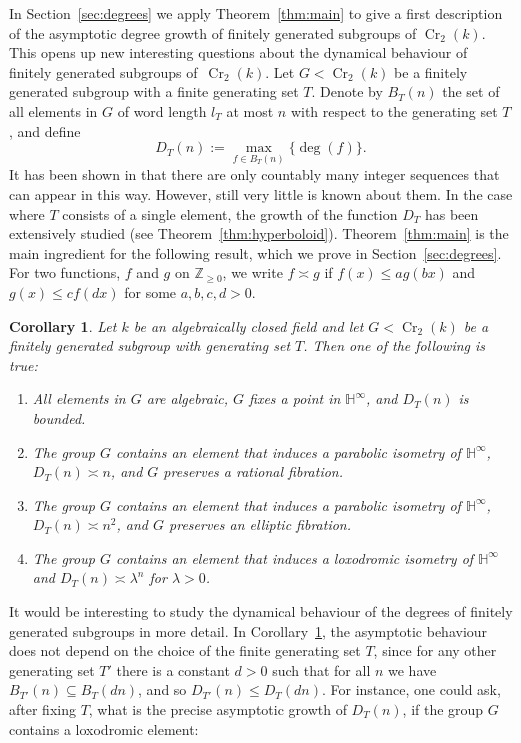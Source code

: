 \documentclass[11pt]{article}
\numberwithin{equation}{section}
\newcommand{\h}{\operatorname{\mathbb{H}^{\infty}}}
\newcommand{\N}{\operatorname{\mathbb{Z}_{\geq 0}}}
\newcommand{\kk}{k}
\newcommand{\Cr}{\operatorname{Cr}}
\theoremstyle{plain}
\newtheorem{corollary}[theorem]{Corollary}
\theoremstyle{definition}
\begin{document}
In Section~\ref{sec:degrees} we apply Theorem~\ref{thm:main} to give a first description of the asymptotic degree growth of finitely generated subgroups of $\Cr_2(k)$. This opens up new interesting questions about the dynamical behaviour of finitely generated subgroups of~$\Cr_2(k)$. Let $G<\Cr_2(k)$ be a finitely generated subgroup with a finite generating set $T$. Denote by $B_T(n)$ the set of all elements in $G$ of word length $l_T$ at most $n$ with respect to the generating set $T$, and define
\[
D_{T}(n):=\max_{f\in B_T(n)}\{\deg(f)\}.
\]
It has been shown in \cite{MR3818624} that there are only countably many integer sequences that can appear in this way. However, still very little is known about them. In the case where $T$ consists of a single element, the growth of the function $D_T$ has been {extensively} studied (see Theorem~\ref{thm:hyperboloid}). Theorem~\ref{thm:main} is the main ingredient for the following result, which we prove in Section~\ref{sec:degrees}. For two functions, $f$ and $g$ on $\N$, we write $f\asymp g$ if $f(x)\leq ag(bx)$ and $g(x)\leq cf(dx)$ for some $a,b,c,d>0$.
\begin{corollary}\label{cor:degree}
Let $\kk$ be an algebraically closed field and let $G<\Cr_2(k)$ be a finitely generated subgroup with generating set $T$. Then one of the following is true:
\begin{enumerate}
\item All elements in $G$ are algebraic, $G$ fixes a point in $\h$, and $D_T(n)$ is bounded.
\item[(2a)] The group $G$ contains an element that induces a parabolic isometry of $\h$, $D_T(n)\asymp n$, and $G$ preserves a rational fibration.
\item[(2b)] The group $G$ contains an element that induces a parabolic isometry of $\h$, $D_T(n)\asymp n^2$, and $G$ preserves an elliptic fibration.
\item[(3)] The group $G$ contains an element that induces a loxodromic isometry of $\h$ and $D_T(n)\asymp\lambda^n$ for $\lambda>0$.
\end{enumerate}
\end{corollary}

It would be interesting to study the dynamical behaviour of the degrees of finitely generated subgroups in more detail. In Corollary~\ref{cor:degree}, the asymptotic behaviour does not depend on the choice of the finite generating set $T$, {since for any other generating set $T'$ there is a constant $d>0$ such that for all $n$ we have $B_{T'}(n)\subseteq B_T(dn)$, and so $D_{T'}(n)\leq D_{T}(dn)$.} For instance, one could ask, after fixing $T$, what is the precise asymptotic growth of $D_T(n)$, if the group $G$ contains a loxodromic element:
\end{document}
